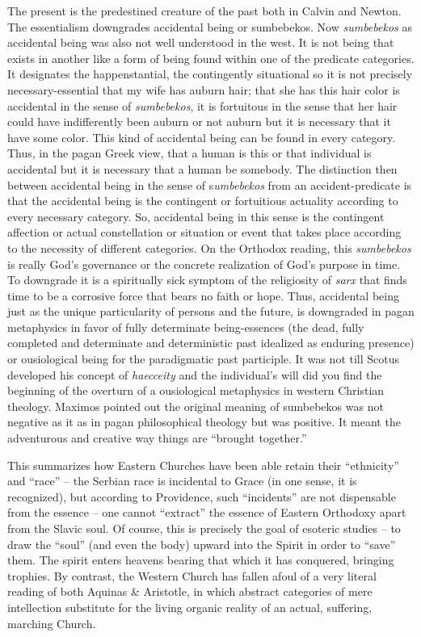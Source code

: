 \begin{quotex}
The present is the predestined creature of the past both in Calvin and Newton. The essentialism downgrades accidental being or sumbebekos. Now \emph{sumbebekos} as accidental being was also not well understood in the west. It is not being that exists in another like a form of being found within one of the predicate categories. It designates the happenstantial, the contingently situational so it is not precisely necessary-essential that my wife has auburn hair; that she has this hair color is accidental in the sense of \emph{sumbebekos}, it is fortuitous in the sense that her hair could have indifferently been auburn or not auburn but it is necessary that it have some color. This kind of accidental being can be found in every category. Thus, in the pagan Greek view, that a human is this or that individual is accidental but it is necessary that a human be somebody. The distinction then between accidental being in the sense of s\emph{umbebekos} from an accident-predicate is that the accidental being is the contingent or fortuitious actuality according to every necessary category. So, accidental being in this sense is the contingent affection or actual constellation or situation or event that takes place according to the necessity of different categories. On the Orthodox reading, this \emph{sumbebekos} is really God's governance or the concrete realization of God's purpose in time. To downgrade it is a spiritually sick symptom of the religiosity of \emph{sarx} that finds time to be a corrosive force that bears no faith or hope. Thus, accidental being just as the unique particularity of persons and the future, is downgraded in pagan metaphysics in favor of fully determinate being-essences (the dead, fully completed and determinate and deterministic past idealized as enduring presence) or ousiological being for the paradigmatic past participle. It was not till Scotus developed his concept of \emph{haecceity} and the individual's will did you find the beginning of the overturn of a ousiological metaphysics in western Christian theology. Maximos pointed out the original meaning of sumbebekos was not negative as it as in pagan philosophical theology but was positive. It meant the adventurous and creative way things are ``brought together.''
\end{quotex}

This summarizes how Eastern Churches have been able retain their ``ethnicity'' and ``race'' -- the Serbian race is incidental to Grace (in one sense, it is recognized), but according to Providence, such ``incidents'' are not dispensable from the essence -- one cannot ``extract'' the essence of Eastern Orthodoxy apart from the Slavic soul. Of course, this is precisely the goal of esoteric studies -- to draw the ``soul'' (and even the body) upward into the Spirit in order to ``save'' them. The spirit enters heavens bearing that which it has conquered, bringing trophies. By contrast, the Western Church has fallen afoul of a very literal reading of both Aquinas \& Aristotle, in which abstract categories of mere intellection substitute for the living organic reality of an actual, suffering, marching Church.

